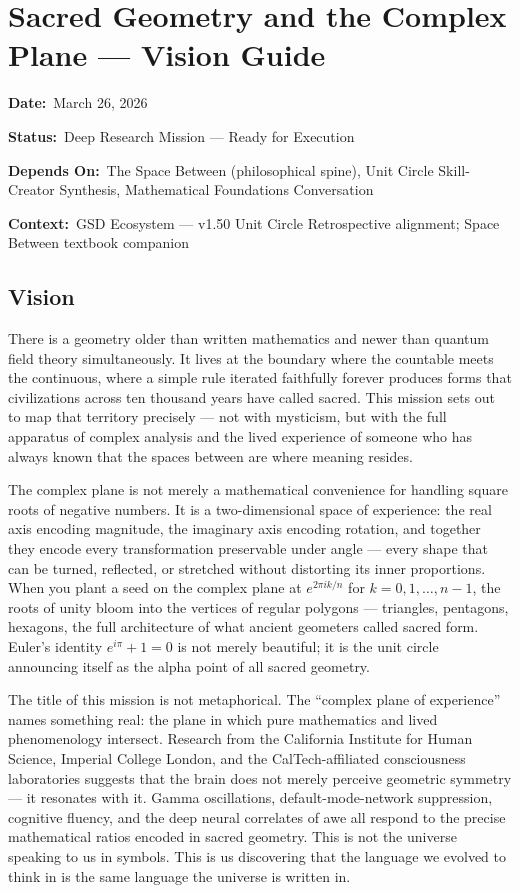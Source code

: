 \documentclass[11pt,letterpaper]{article}
\newcommand{\metafield}[2]{\textbf{\sffamily #1}\ #2\par}
\begin{document}
\section{Sacred Geometry and the Complex Plane --- Vision Guide}

\metafield{Date:}{March 26, 2026}
\metafield{Status:}{Deep Research Mission --- Ready for Execution}
\metafield{Depends On:}{The Space Between (philosophical spine), Unit Circle Skill-Creator Synthesis, Mathematical Foundations Conversation}
\metafield{Context:}{GSD Ecosystem --- v1.50 Unit Circle Retrospective alignment; Space Between textbook companion}

\subsection{Vision}

There is a geometry older than written mathematics and newer than quantum field theory simultaneously. It lives at the boundary where the countable meets the continuous, where a simple rule iterated faithfully forever produces forms that civilizations across ten thousand years have called sacred. This mission sets out to map that territory precisely --- not with mysticism, but with the full apparatus of complex analysis and the lived experience of someone who has always known that the spaces between are where meaning resides.

The complex plane is not merely a mathematical convenience for handling square roots of negative numbers. It is a two-dimensional space of experience: the real axis encoding magnitude, the imaginary axis encoding rotation, and together they encode every transformation preservable under angle --- every shape that can be turned, reflected, or stretched without distorting its inner proportions. When you plant a seed on the complex plane at $e^{2\pi i k/n}$ for $k = 0, 1, \ldots, n-1$, the roots of unity bloom into the vertices of regular polygons --- triangles, pentagons, hexagons, the full architecture of what ancient geometers called sacred form. Euler's identity $e^{i\pi} + 1 = 0$ is not merely beautiful; it is the unit circle announcing itself as the alpha point of all sacred geometry.

The title of this mission is not metaphorical. The ``complex plane of experience'' names something real: the plane in which pure mathematics and lived phenomenology intersect. Research from the California Institute for Human Science, Imperial College London, and the CalTech-affiliated consciousness laboratories suggests that the brain does not merely perceive geometric symmetry --- it resonates with it. Gamma oscillations, default-mode-network suppression, cognitive fluency, and the deep neural correlates of awe all respond to the precise mathematical ratios encoded in sacred geometry. This is not the universe speaking to us in symbols. This is us discovering that the language we evolved to think in is the same language the universe is written in.
\end{document}
